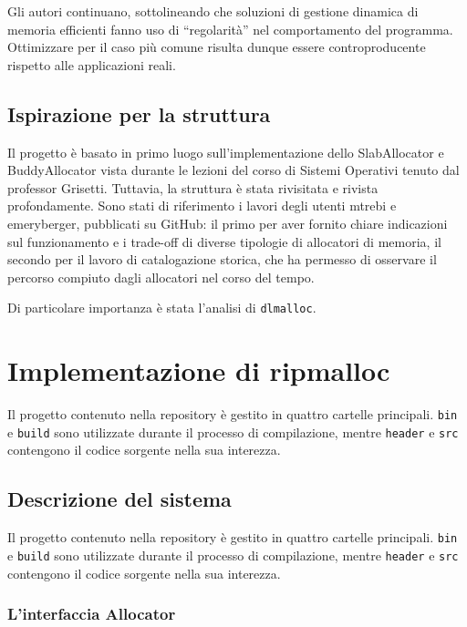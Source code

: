 \documentclass[noexaminfo]{sapthesis}
\begin{document}
Gli autori continuano, sottolineando che soluzioni di gestione dinamica di memoria efficienti fanno uso di ``regolarità'' nel comportamento del programma. Ottimizzare per il caso più comune risulta dunque essere controproducente rispetto alle applicazioni reali.

\section{Ispirazione per la struttura}
Il progetto è basato in primo luogo sull’implementazione dello SlabAllocator e BuddyAllocator vista durante le lezioni del corso di Sistemi Operativi tenuto dal professor Grisetti. Tuttavia, la struttura è stata rivisitata e rivista profondamente. Sono stati di riferimento i lavori degli utenti mtrebi e emeryberger, pubblicati su GitHub: il primo per aver fornito chiare indicazioni sul funzionamento e i trade-off di diverse tipologie di allocatori di memoria, il secondo per il lavoro di catalogazione storica, che ha permesso di osservare il percorso compiuto dagli allocatori nel corso del tempo.

Di particolare importanza è stata l’analisi di \texttt{dlmalloc}.

\chapter{Implementazione di ripmalloc}

Il progetto contenuto nella repository è gestito in quattro cartelle principali. \texttt{bin} e \texttt{build} sono utilizzate durante il processo di compilazione, mentre \texttt{header} e \texttt{src} contengono il codice sorgente nella sua interezza.

\section{Descrizione del sistema}

Il progetto contenuto nella repository è gestito in quattro cartelle principali. \texttt{bin} e \texttt{build} sono utilizzate durante il processo di compilazione, mentre \texttt{header} e \texttt{src} contengono il codice sorgente nella sua interezza.

\subsection{L’interfaccia Allocator}
\end{document}
